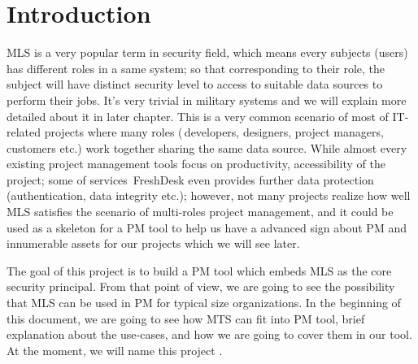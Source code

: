 
\chapter{Introduction} %

\label{ch:introduction} %


MLS is a very popular term in security field, which means every subjects (\ie users) has different roles in a same system; so that corresponding to their role, the subject will have distinct security level to access to suitable data sources to perform their jobs.
It's very trivial in military systems and we will explain more detailed about it in later chapter.
This is a very common scenario of most of IT-related projects where many roles (\eg\,developers, designers, project managers, customers etc.) work together sharing the same data source.
While almost every existing project management tools focus on productivity, accessibility of the project; some of services \eg\,FreshDesk even provides further data protection (authentication, data integrity etc.); however, not many projects realize how well MLS satisfies the scenario of multi-roles project management, and it could be used as a skeleton for a PM tool to help us have a advanced sign about PM and innumerable assets for our projects which we will see later.

The goal of this project is to build a PM tool which embeds MLS as the core security principal.
From that point of view, we are going to see the possibility that MLS can be used in PM for typical size organizations.
In the beginning of this document, we are going to see how MTS can fit into PM tool, brief explanation about the use-cases, and how we are going to cover them in our tool.
At the moment, we will name this project \myProject.



